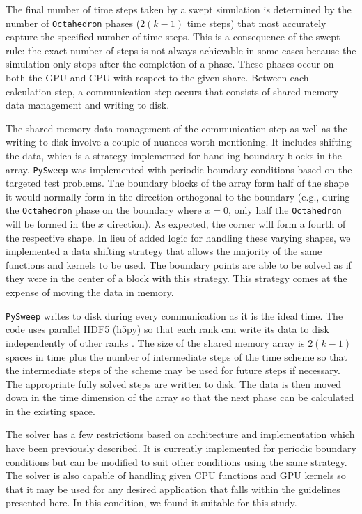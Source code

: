 \documentclass[preprints,article,accept,moreauthors,pdftex]{Definitions/mdpi}
\def\pysweep{\texttt{PySweep}}
\def\Oct{\texttt{Octahedron}}
\begin{document}
\par
The final number of time steps taken by a swept simulation is determined by the number of \Oct{} phases ($2(k-1)$ time steps) that most accurately capture the specified number of time steps. This is a consequence of the swept rule: the exact number of steps is not always achievable in some cases because the simulation only stops after the completion of a phase. These phases occur on both the GPU and CPU with respect to the given share. Between each calculation step, a communication step occurs that consists of shared memory data management and writing to disk.

\par The shared-memory data management of the communication step as well as the writing to disk involve a couple of nuances worth mentioning. It includes shifting the data, which is a strategy implemented for handling boundary blocks in the array. \pysweep{} was implemented with periodic boundary conditions based on the targeted test problems. The boundary blocks of the array form half of the shape it would normally form in the direction orthogonal to the boundary (e.g., during the \Oct{} phase on the boundary where $x=0$, only half the \Oct{} will be formed in the $x$ direction). As expected, the corner will form a fourth of the respective shape. In lieu of added logic for handling these varying shapes, we implemented a data shifting strategy that allows the majority of the same functions and kernels to be used. The boundary points are able to be solved as if they were in the center of a block with this strategy. This strategy comes at the expense of moving the data in memory. 

\par \pysweep{} writes to disk during every communication as it is the ideal time. The code uses parallel HDF5 (h5py) so that each rank can write its data to disk independently of other ranks \cite{Collette2008HDF5Python}. The size of the shared memory array is $2(k-1)$ spaces in time plus the number of intermediate steps of the time scheme so that the intermediate steps of the scheme may be used for future steps if necessary. The appropriate fully solved steps are written to disk. The data is then moved down in the time dimension of the array so that the next phase can be calculated in the existing space.

\par
The solver has a few restrictions based on architecture and implementation which have been previously described. It is currently implemented for periodic boundary conditions but can be modified to suit other conditions using the same strategy. The solver is also capable of handling given CPU functions and GPU kernels so that it may be used for any desired application that falls within the guidelines presented here. In this condition, we found it suitable for this study.
\end{document}
